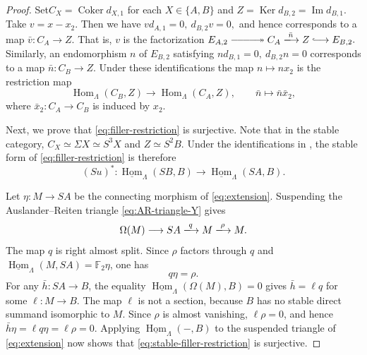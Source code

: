 \documentclass[a4paper,reqno,10pt]{amsart}
\let\shorttwoheadrightarrow\twoheadrightarrow
\renewcommand{\hookrightarrow}{\lhook\joinrel\longrightarrow}
\renewcommand{\twoheadrightarrow}{\relbar\joinrel\relbar\joinrel
\shorttwoheadrightarrow}
\numberwithin{equation}{section}
\DeclareMathOperator{\Hom}{Hom}
\newcommand{\kk}{\mathbb F_2}
\newcommand{\Lam}{\Lambda}
\newcommand{\ol}[1]{\underline{#1}}
\begin{document}
\begin{proof}
Set$
 C_X=\operatorname{Coker}d_{X,1}$ for each $X\in\{A,B\}$ and  $Z=\operatorname{Ker}d_{B,2}=\operatorname{Im}d_{B,1}.
$
Take $v=x-x_2$. Then we have
$
 vd_{A,1}=0,~d_{B,2}v=0,
$
and hence corresponds to a map $\bar v:C_A\longrightarrow Z$. That is, $v$ is the factorization  $
E_{A,2}\twoheadrightarrow C_A\xlongrightarrow{\bar n}
 Z\hookrightarrow E_{B,2}.
 $
Similarly, an
endomorphism $n$ of $E_{B,2}$ satisfying
$
 nd_{B,1}=0,~ d_{B,2}n=0
$
corresponds to a map $\bar n:C_B\longrightarrow Z$. Under these
identifications the map $n\mapsto nx_2$ is the restriction map
\begin{equation}\label{eq:filler-restriction}
 \Hom_\Lam(C_B,Z)\longrightarrow\Hom_\Lam(C_A,Z),
 \qquad \bar n\longmapsto\bar n\bar x_2,
\end{equation}
where $\bar x_2:C_A\longrightarrow C_B$ is induced by $x_2$.

Next, we prove that \eqref{eq:filler-restriction} is surjective. Note that in the stable category,
$C_X\simeq\Sigma X\simeq S^3X$ and $Z\simeq S^2B.
$
Under the identifications in
, the stable form of
\eqref{eq:filler-restriction} is therefore
\begin{equation}\label{eq:stable-filler-restriction}
 (Su)^*:\ol{\Hom}_\Lam(SB,B)\longrightarrow
 \ol{\Hom}_\Lam(SA,B).
\end{equation}

Let $\eta:M\longrightarrow SA$ be the connecting morphism of
\eqref{eq:extension}. Suspending the Auslander--Reiten triangle
\eqref{eq:AR-triangle-Y} gives
\begin{equation}\label{eq:AR-triangle-M}
 \Omega(M)\longrightarrow SA\xlongrightarrow{q}M
 \xlongrightarrow{\rho}M.
\end{equation}
The map $q$ is right almost split. Since $\rho$ factors through $q$ and
$\ol{\Hom}_\Lam(M,SA)=\kk\eta$, one has
\begin{equation}\label{eq:q-eta}
 q\eta=\rho.
\end{equation}
For any $\bar h:SA\longrightarrow B$, the equality
$\ol{\Hom}_\Lam(\Omega(M),B)=0$ gives $\bar h=\ell q$ for some
$\ell:M\longrightarrow B$. The map $\ell$ is not a section, because $B$
has no stable direct summand isomorphic to $M$. Since $\rho$ is almost
vanishing, $\ell\rho=0$, and hence
$
 \bar h\eta=\ell q\eta=\ell\rho=0.
$
Applying $\ol{\Hom}_\Lam(-,B)$ to the suspended triangle of
\eqref{eq:extension} now shows that
\eqref{eq:stable-filler-restriction} is surjective.


\end{proof}
\end{document}
